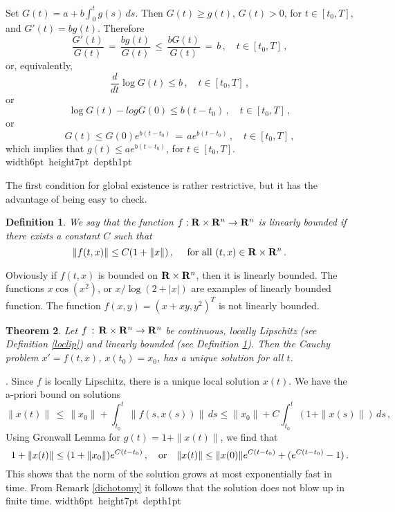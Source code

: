 \documentclass[12pt]{report}
\newcommand{\bR}{{\bf R}}
\newtheorem{theorem}{Theorem}[section]
\newtheorem{definition}[theorem]{Definition}
\newcommand{\proof}{\noindent {\em Proof:~}}
\def\qed{\hbox{\hskip 6pt\vrule width6pt height7pt depth1pt
    \hskip1pt}\bigskip}
\def\to{\rightarrow}
\begin{document}
\proof Set $G(t) = a  + b \int_0^t g(s) \,ds$. Then $G(t) \ge g(t)$, 
$G(t) > 0$, for  $t \in [t_0,T]$, and 
$G'(t)=b g(t)$. Therefore
\begin{equation}
\frac{G'(t)}{G(t)} \,=\,  \frac{bg(t)}{G(t)} \,\le \,  \frac{b G(t)}{G(t)}  
\,=\, b\,,  \quad t \in [t_0,T] \,,
\end{equation}
or, equivalently, 
\begin{equation}
\frac{d}{dt} \log G(t) \le b \,,\quad t \in [t_0,T] \,,
\end{equation}
or
\begin{equation}
\log G(t) - log G(0) \le b(t-t_0) \,,\quad t \in [t_0,T] \,,
\end{equation}
or
\begin{equation}
G(t)\le G(0)e^{b(t-t_0)}\,=\, a e^{b(t-t_0)} \,,\quad t \in [t_0,T]\,,
\end{equation}
which implies that $g(t) \le a e^{b(t-t_0)}$, for $t \in [t_0,T]$. \hfill \qed

The first condition for global existence is rather restrictive, but it
has the advantage of being easy to check.

\begin{definition}\label{linbounded}
{\rm  We say that
the function $f: \bR \times \bR^n \to \bR^n$ is {\em linearly bounded} if there
exists a constant $C$ such that
\begin{equation}\label{lb}
\|f(t, x)\| \le C(1 + \|x\|)\,, \quad {\rm ~for~all~} (t,x) \in \bR \times 
\bR^n \,.
\end{equation} 
}
\end{definition}

Obviously if $f(t,x)$ is bounded on $\bR \times \bR^n$, then it is
linearly bounded.  The functions $x \cos(x^2)$, or $x/\log(2+|x|)$ are
examples of linearly bounded function.  The function $f(x,y) = (x +
xy, y^2)^T$ is not linearly bounded.
 


\begin{theorem}\label{g1} 
Let $f \,:\, \bR\times \bR^n \to \bR^n$ be continuous,  
locally Lipschitz (see Definition
\ref{loclip}) and linearly bounded (see Definition \ref{linbounded}). 
Then the Cauchy
problem $x'=f(t,x)$, $x(t_0) = x_0$, has a unique solution for all $t$. 
\end{theorem} 

\proof.  Since $f$ is locally 
Lipschitz, there is a unique local solution $x(t)$.  We have the a-priori 
bound on solutions
\begin{equation}
\|x(t)\|\,\le\, \|x_0\| + \int_{t_0}^t \|f(s,x(s))\| \, ds  \le \|x_0\| + C 
\int_{t_0}^t ( 1 + \|x(s)\|) \, ds  \,, 
\end{equation}
Using Gronwall Lemma for $g(t) = 1 + \|x(t)\|$, we find that 
\begin{equation}
1 + \|x(t)\| \le  (1 + \|x_0\|) e^{C(t-t_0)} \,, \quad {\rm or} \quad 
\|x(t)\| \le \|x(0)\|e^{C(t-t_0)} + (e^{C(t-t_0)}-1) \,.
\end{equation}
This shows that the norm of the solution grows at most exponentially
fast in time. From Remark \ref{dichotomy} it follows that the solution
does not blow up in finite time. \hfill \qed
\end{document}
